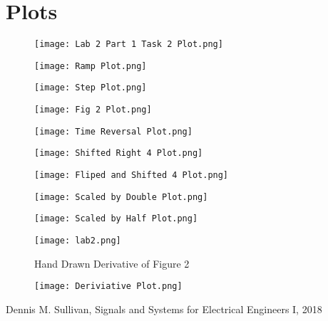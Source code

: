 \documentclass[12pt]{report}
\begin{document}
\section{Plots}
\begin{figure}[ht]
\texttt{[image: Lab 2 Part 1 Task 2 Plot.png]}
\end{figure}
\begin{figure}[ht]
\texttt{[image: Ramp Plot.png]}
\end{figure}
\begin{figure}[ht]
\texttt{[image: Step Plot.png]}
\end{figure}
\begin{figure}[ht]
\texttt{[image: Fig 2 Plot.png]}
\end{figure}

\pagebreak
\begin{figure}[ht]
\texttt{[image: Time Reversal Plot.png]}
\end{figure}
\begin{figure}[ht]
\texttt{[image: Shifted Right 4 Plot.png]}
\end{figure}
\pagebreak
\begin{figure}[ht]
\texttt{[image: Fliped and Shifted 4 Plot.png]}
\end{figure}
\begin{figure}[ht]
\texttt{[image: Scaled by Double Plot.png]}
\end{figure}
\begin{figure}[ht]
\texttt{[image: Scaled by Half Plot.png]}
\end{figure}
\begin{figure}[ht]
\texttt{[image: lab2.png]}
\caption{Hand Drawn Derivative of Figure 2}
\end{figure}
\begin{figure}[ht]
\texttt{[image: Deriviative Plot.png]}
\end{figure}
\pagebreak

\newpage

\newpage
\begin{thebibliography}{111}
Dennis M. Sullivan,
Signals and Systems for Electrical Engineers I,
 2018
\end{thebibliography}
\end{document}
